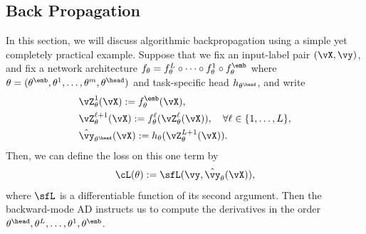 \documentclass[../../book-main.tex]{subfiles}
\begin{document}
\subsection{Back Propagation}
\label{app:BP-section}
In this section, we will discuss algorithmic backpropagation using a simple yet completely practical example. Suppose that we fix an input-label pair \((\vX, \vy)\), and fix a network architecture \(f_{\theta} = f_{\theta}^{L} \circ \cdots \circ f_{\theta}^{1} \circ f_{\theta}^{\emb}\) where \(\theta = (\theta^{\emb}, \theta^{1}, \dots, \theta^{m}, \theta^{\head})\) and task-specific head \(h_{\theta^{\head}}\), and write
\begin{align}
    &\vZ_{\theta}^{1}(\vX) := f_{\theta}^{\emb}(\vX), \\ 
    &\vZ_{\theta}^{\ell + 1}(\vX) := f_{\theta}^{\ell}(\vZ_{\theta}^{\ell}(\vX)), \quad \forall \ell \in \{1, \dots, L\}, \\
    &\hat{\vy}_{\theta^{\head}}(\vX) := h_{\theta}(\vZ_{\theta}^{L+1}(\vX)).
\end{align}
Then, we can define the loss on this one term by 
\begin{equation}
    \cL(\theta) := \sfL(\vy, \hat{\vy}_{\theta}(\vX)),
\end{equation}
where \(\sfL\) is a differentiable function of its second argument. Then the backward-mode AD instructs us to compute the derivatives in the order \(\theta^{\head}, \theta^{L}, \dots, \theta^{1}, \theta^{\emb}\). 
\end{document}
